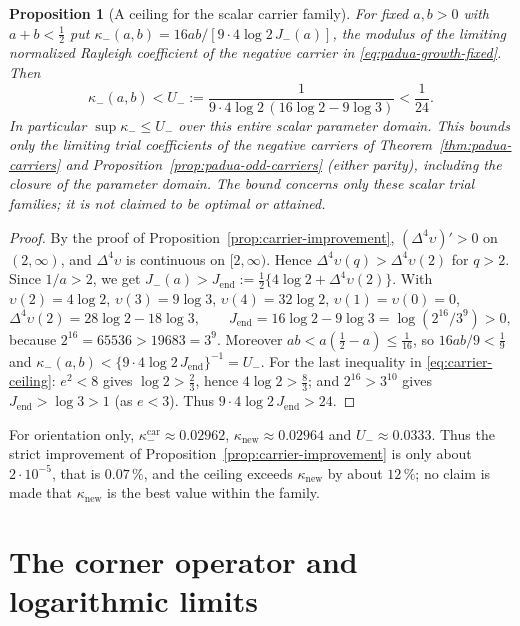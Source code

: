 \documentclass[preprint,12pt,a4paper]{elsarticle}
\newtheorem{proposition}[theorem]{Proposition}
\theoremstyle{remark}
\begin{document}
\begin{proposition}[A ceiling for the scalar carrier family]\label{prop:carrier-ceiling}
For fixed $a,b>0$ with $a+b<\frac12$ put
$\kappa_-(a,b)=16ab/[9\cdot4\log2\,J_-(a)]$, the modulus of the
limiting normalized Rayleigh coefficient of the negative carrier in
\eqref{eq:padua-growth-fixed}. Then
\begin{equation}\label{eq:carrier-ceiling}
 \kappa_-(a,b)<U_-:=\frac1{9\cdot4\log2\,(16\log2-9\log3)}<\frac1{24}.
\end{equation}
In particular $\sup\kappa_-\le U_-$ over this entire scalar parameter
domain. This bounds only the limiting trial coefficients of the negative
carriers of Theorem~\ref{thm:padua-carriers} and
Proposition~\ref{prop:padua-odd-carriers} (either parity), including the
closure of the parameter domain. The bound concerns only these scalar trial
families; it is not claimed to be optimal or attained.
\end{proposition}
\begin{proof}
By the proof of Proposition~\ref{prop:carrier-improvement},
$(\Delta^4\upsilon)'>0$ on $(2,\infty)$, and $\Delta^4\upsilon$ is continuous on
$[2,\infty)$. Hence $\Delta^4\upsilon(q)>\Delta^4\upsilon(2)$ for $q>2$. Since
$1/a>2$, we get $J_-(a)>J_{\mathrm{end}}:=\frac12\{4\log2+\Delta^4\upsilon(2)\}$.
With $\upsilon(2)=4\log2$, $\upsilon(3)=9\log3$, $\upsilon(4)=32\log2$, $\upsilon(1)=\upsilon(0)=0$,
\[
 \Delta^4\upsilon(2)=28\log2-18\log3,\qquad
 J_{\mathrm{end}}=16\log2-9\log3=\log(2^{16}/3^9)>0,
\]
because $2^{16}=65536>19683=3^9$. Moreover $ab<a(\frac12-a)\le\frac1{16}$, so
$16ab/9<\frac19$ and
$\kappa_-(a,b)<\{9\cdot4\log2\,J_{\mathrm{end}}\}^{-1}=U_-$.
For the last inequality in \eqref{eq:carrier-ceiling}: $e^2<8$ gives
$\log2>\frac23$, hence $4\log2>\frac83$; and $2^{16}>3^{10}$ gives
$J_{\mathrm{end}}>\log3>1$ (as $e<3$). Thus
$9\cdot4\log2\,J_{\mathrm{end}}>24$.
\end{proof}

For orientation only, $\kappa^{\mathrm{car}}_-\approx0.02962$,
$\kappa_{\mathrm{new}}\approx0.02964$ and $U_-\approx0.0333$. Thus the strict
improvement of Proposition~\ref{prop:carrier-improvement} is only about
$2\cdot10^{-5}$, that is $0.07\,\%$, and the ceiling exceeds $\kappa_{\mathrm{new}}$
by about $12\,\%$; no claim is made that $\kappa_{\mathrm{new}}$ is the best value
within the family.

\section{The corner operator and logarithmic limits}\label{sec:corner}
\end{document}
